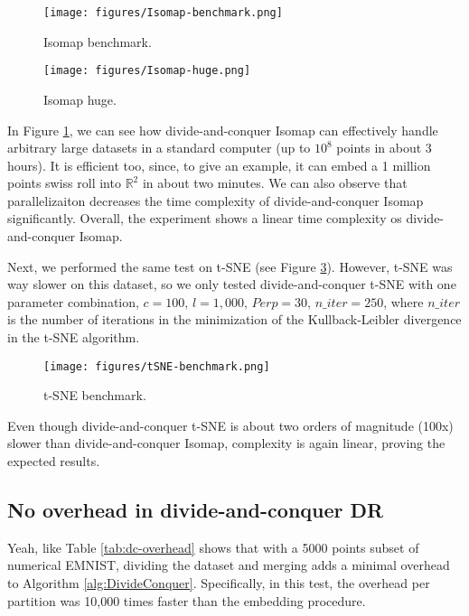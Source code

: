 \begin{figure}[ht]
    \centering
    \texttt{[image: figures/Isomap-benchmark.png]}
    \caption{Isomap benchmark.}
    \label{fig:Isomap-benchmark}
\end{figure}

\begin{figure}[ht]
    \centering
    \texttt{[image: figures/Isomap-huge.png]}
    \caption{Isomap huge.}
    \label{fig:Isomap-huge}
\end{figure}

In Figure \ref{fig:Isomap-benchmark}, we can see how divide-and-conquer Isomap can effectively handle arbitrary large datasets in a standard computer (up to $10^8$ points in about 3 hours). It is efficient too, since, to give an example, it can embed a 1 million points swiss roll into $\mathbb{R}^2$ in about two minutes. We can also observe that parallelizaiton decreases the time complexity of divide-and-conquer Isomap significantly. Overall, the experiment shows a linear time complexity os divide-and-conquer Isomap.

Next, we performed the same test on t-SNE (see Figure \ref{fig:t-SNE-benchmark}). However, t-SNE was way slower on this dataset, so we only tested divide-and-conquer t-SNE with one parameter combination, $c = 100, \, l=1,000, \, Perp=30, \, n\_iter=250$, where $n\_iter$ is the number of iterations in the minimization of the Kullback-Leibler divergence in the t-SNE algorithm.

\begin{figure}[ht]
    \centering
    \texttt{[image: figures/tSNE-benchmark.png]}
    \caption{t-SNE benchmark.}
    \label{fig:t-SNE-benchmark}
\end{figure}

Even though divide-and-conquer t-SNE is about two orders of magnitude (100x) slower than divide-and-conquer Isomap, complexity is again linear, proving the expected results.

\subsection{No overhead in divide-and-conquer DR}

Yeah, like Table \ref{tab:dc-overhead} shows that with a 5000 points subset of numerical EMNIST, dividing the dataset and merging adds a minimal overhead to Algorithm \ref{alg:DivideConquer}. Specifically, in this test, the overhead per partition was 10,000 times faster than the embedding procedure.

